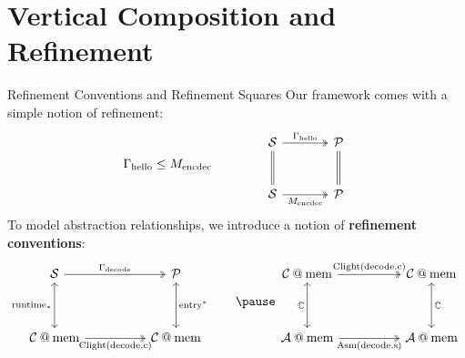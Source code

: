 \documentclass[aspectratio=1610,mathserif]{beamer}
\newcommand{\kw}[1]{\ensuremath{ \mathrm{#1} }}
\begin{document}
\section{Vertical Composition and Refinement}

\begin{frame}[fragile]{Refinement Conventions and Refinement Squares} %
Our framework comes with a simple notion of refinement:
\[
  \Gamma_\kw{hello} \le M_\kw{encdec}
  \qquad \qquad
  \begin{tikzcd}[sep=large]
    \mathcal{S} \ar[d,equal] \ar[r,"\Gamma_\kw{hello}", twoheadrightarrow] &
    \mathcal{P} \ar[d,equal] \\
    \mathcal{S} \ar[r, "M_\kw{encdec}"', twoheadrightarrow] & \mathcal{P}
  \end{tikzcd}
\]
\pause
To model abstraction relationships,
we introduce a notion of
\textbf{refinement conventions}:
\[
  \begin{tikzcd}[sep=huge]
    \mathcal{S} \ar[d,"\kw{runtime}_*"', leftrightarrow]
      \ar[r, "\Gamma_\kw{decode}", twoheadrightarrow] &
    \mathcal{P} \ar[d,"\kw{entry}^*", leftrightarrow] \\
    \mathcal{C} \mathbin@ \kw{mem} \ar[r, "\kw{Clight}(\kw{decode.c})"', twoheadrightarrow] &
    \mathcal{C} \mathbin@ \kw{mem}
  \end{tikzcd}
  \qquad \pause
  \begin{tikzcd}[sep=huge]
    \mathcal{C} \mathbin@ \kw{mem} \ar[d, "\mathbb{C}"', leftrightarrow]
      \ar[r, "\kw{Clight}(\kw{decode.c})", twoheadrightarrow] &
    \mathcal{C} \mathbin@ \kw{mem} \ar[d, "\mathbb{C}", leftrightarrow] \\
    \mathcal{A} \mathbin@ \kw{mem} \ar[r, "\kw{Asm}(\kw{decode.s})"', twoheadrightarrow] &
    \mathcal{A} \mathbin@ \kw{mem}
  \end{tikzcd}
\]
\end{frame}
\end{document}
